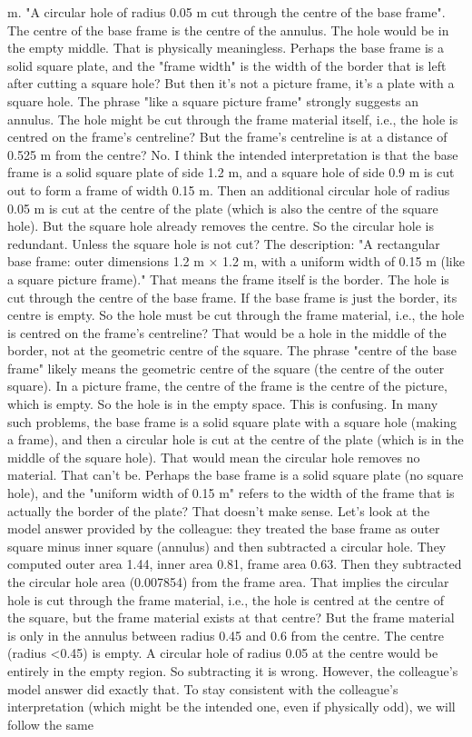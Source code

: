 \documentclass[11pt]{article}
\begin{document}
\begin{exoresolu}
\begin{enumerate}
\begin{itemize}
m. "A circular hole of radius 0.05 m cut through the centre of the base frame". The centre of the base frame is the centre of the annulus. The hole would be in the empty middle. That is physically meaningless. Perhaps the base frame is a solid square plate, and the "frame width" is the width of the border that is left after cutting a square hole? But then it's not a picture frame, it's a plate with a square hole. The phrase "like a square picture frame" strongly suggests an annulus. The hole might be cut through the frame material itself, i.e., the hole is centred on the frame's centreline? But the frame's centreline is at a distance of 0.525 m from the centre? No. I think the intended interpretation is that the base frame is a solid square plate of side 1.2 m, and a square hole of side 0.9 m is cut out to form a frame of width 0.15 m. Then an additional circular hole of radius 0.05 m is cut at the centre of the plate (which is also the centre of the square hole). But the square hole already removes the centre. So the circular hole is redundant. Unless the square hole is not cut? The description: "A rectangular base frame: outer dimensions 1.2 m × 1.2 m, with a uniform width of 0.15 m (like a square picture frame)." That means the frame itself is the border. The hole is cut through the centre of the base frame. If the base frame is just the border, its centre is empty. So the hole must be cut through the frame material, i.e., the hole is centred on the frame's centreline? That would be a hole in the middle of the border, not at the geometric centre of the square. The phrase "centre of the base frame" likely means the geometric centre of the square (the centre of the outer square). In a picture frame, the centre of the frame is the centre of the picture, which is empty. So the hole is in the empty space. This is confusing. In many such problems, the base frame is a solid square plate with a square hole (making a frame), and then a circular hole is cut at the centre of the plate (which is in the middle of the square hole). That would mean the circular hole removes no material. That can't be. Perhaps the base frame is a solid square plate (no square hole), and the "uniform width of 0.15 m" refers to the width of the frame that is actually the border of the plate? That doesn't make sense. Let's look at the model answer provided by the colleague: they treated the base frame as outer square minus inner square (annulus) and then subtracted a circular hole. They computed outer area 1.44, inner area 0.81, frame area 0.63. Then they subtracted the circular hole area (0.007854) from the frame area. That implies the circular hole is cut through the frame material, i.e., the hole is centred at the centre of the square, but the frame material exists at that centre? But the frame material is only in the annulus between radius 0.45 and 0.6 from the centre. The centre (radius <0.45) is empty. A circular hole of radius 0.05 at the centre would be entirely in the empty region. So subtracting it is wrong. However, the colleague's model answer did exactly that. To stay consistent with the colleague's interpretation (which might be the intended one, even if physically odd), we will follow the same 
\end{itemize}
\end{enumerate}
\end{exoresolu}
\end{document}
